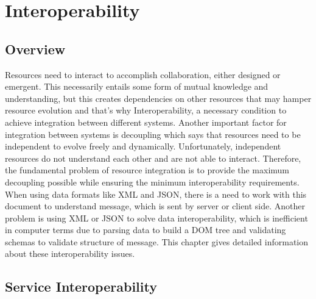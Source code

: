 

\chapter{Interoperability}
\label{chapter:interoperability}
\section{Overview}
\label{section:overview}
Resources need to interact to accomplish collaboration, either designed or emergent. This necessarily entails some form of mutual knowledge and understanding, but this creates dependencies on other resources that may hamper resource evolution and that's why Interoperability, a necessary condition to achieve integration between different systems. Another important factor for integration between systems is decoupling which says that resources need to be independent to evolve freely and dynamically. Unfortunately, independent resources do not understand each other and are not able to interact. Therefore, the fundamental problem of resource integration is to provide the maximum decoupling possible while ensuring the minimum interoperability requirements. When using data formats like XML and JSON, there is a need to work with this document to understand message, which is sent by server or client side. Another problem is using XML or JSON to solve data interoperability, which is inefficient in computer terms due to parsing data to build a DOM tree and validating schemas to validate structure of message. This chapter gives detailed information about these interoperability issues.

\section{Service Interoperability}
\label{section:InteroperabilityService}

